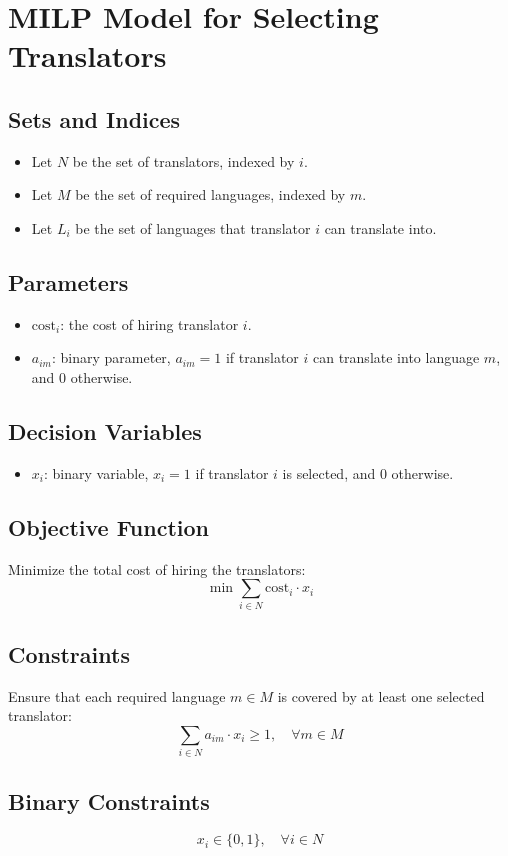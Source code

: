 \documentclass{article}
\begin{document}
\section*{MILP Model for Selecting Translators}

\subsection*{Sets and Indices}
\begin{itemize}
    \item Let \( N \) be the set of translators, indexed by \( i \).
    \item Let \( M \) be the set of required languages, indexed by \( m \).
    \item Let \( L_i \) be the set of languages that translator \( i \) can translate into.
\end{itemize}

\subsection*{Parameters}
\begin{itemize}
    \item \( \text{cost}_i \): the cost of hiring translator \( i \).
    \item \( a_{im} \): binary parameter, \( a_{im} = 1 \) if translator \( i \) can translate into language \( m \), and \( 0 \) otherwise.
\end{itemize}

\subsection*{Decision Variables}
\begin{itemize}
    \item \( x_i \): binary variable, \( x_i = 1 \) if translator \( i \) is selected, and \( 0 \) otherwise.
\end{itemize}

\subsection*{Objective Function}
Minimize the total cost of hiring the translators:
\[
\min \sum_{i \in N} \text{cost}_i \cdot x_i
\]

\subsection*{Constraints}
Ensure that each required language \( m \in M \) is covered by at least one selected translator:
\[
\sum_{i \in N} a_{im} \cdot x_i \geq 1, \quad \forall m \in M
\]

\subsection*{Binary Constraints}
\[
x_i \in \{0, 1\}, \quad \forall i \in N
\]
\end{document}
